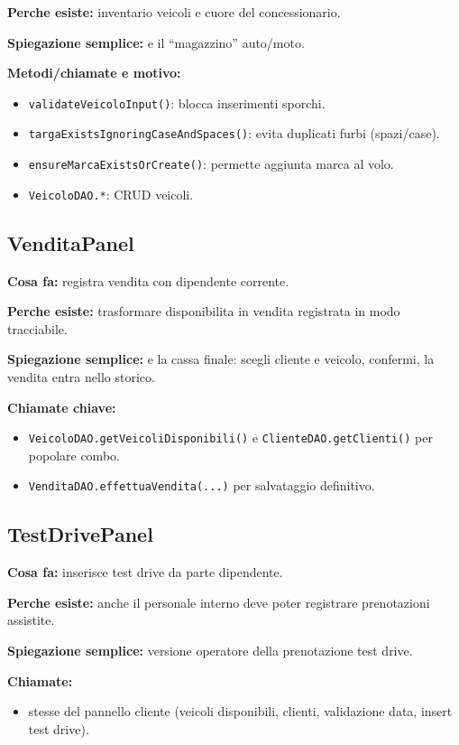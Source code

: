 \documentclass[12pt,a4paper]{article}
\begin{document}
\textbf{Perche esiste:} inventario veicoli e cuore del concessionario.

\textbf{Spiegazione semplice:} e il ``magazzino'' auto/moto.

\textbf{Metodi/chiamate e motivo:}
\begin{itemize}
  \item \texttt{validateVeicoloInput()}: blocca inserimenti sporchi.
  \item \texttt{targaExistsIgnoringCaseAndSpaces()}: evita duplicati furbi (spazi/case).
  \item \texttt{ensureMarcaExistsOrCreate()}: permette aggiunta marca al volo.
  \item \texttt{VeicoloDAO.*}: CRUD veicoli.
\end{itemize}

\subsection{VenditaPanel}
\textbf{Cosa fa:} registra vendita con dipendente corrente.

\textbf{Perche esiste:} trasformare disponibilita in vendita registrata in modo tracciabile.

\textbf{Spiegazione semplice:} e la cassa finale: scegli cliente e veicolo, confermi, la vendita entra nello storico.

\textbf{Chiamate chiave:}
\begin{itemize}
  \item \texttt{VeicoloDAO.getVeicoliDisponibili()} e \texttt{ClienteDAO.getClienti()} per popolare combo.
  \item \texttt{VenditaDAO.effettuaVendita(...)} per salvataggio definitivo.
\end{itemize}

\subsection{TestDrivePanel}
\textbf{Cosa fa:} inserisce test drive da parte dipendente.

\textbf{Perche esiste:} anche il personale interno deve poter registrare prenotazioni assistite.

\textbf{Spiegazione semplice:} versione operatore della prenotazione test drive.

\textbf{Chiamate:}
\begin{itemize}
  \item stesse del pannello cliente (veicoli disponibili, clienti, validazione data, insert test drive).
\end{itemize}
\end{document}
